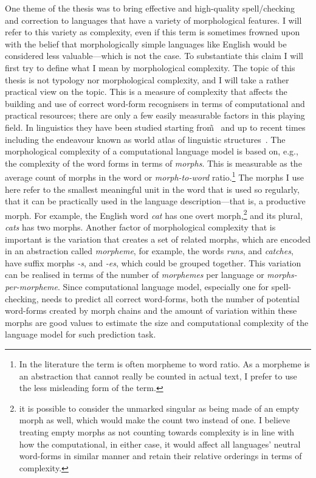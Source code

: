 \documentclass[officiallayout]{unihelcompling}
\begin{document}
One theme of the thesis was to bring effective and high-quality
spell\-/checking and correction to languages that have a variety of
morphological features. I will refer to this variety as complexity, even if
this term is sometimes frowned upon with the belief that morphologically simple
languages like English would be considered less valuable---which is not the
case.  To substantiate this claim I will first try to define what I mean by
morphological complexity.  The topic of this thesis is not typology nor
morphological complexity, and I will take a rather practical view on the topic.
This is a measure of complexity that affects the building and use of correct
word-form recognisers in terms of computational and practical resources; there
are only a few easily measurable factors in this playing field. In linguistics
they have been studied starting from̃~\citep{greenberg1960qualitative} and up
to recent times including the endeavour known as world atlas of linguistic
structures~\citep{wals}.
The
morphological complexity of a computational language model is based on, e.g.,
the complexity of the word forms in terms of \emph{morphs}.  This is measurable
as the average count of morphs in the word or \emph{morph-to-word}
ratio.\footnote{In the literature the term is often morpheme to word ratio. As
a morpheme is an abstraction that cannot really be counted in actual text, I
prefer to use the less misleading form of the term.} The morphs I use here
refer to the smallest meaningful unit in the word that is used so regularly,
that it can be practically used in the language description---that is, a
productive morph. For example, the English word \emph{cat} has one overt
morph,\footnote{it is possible to consider the unmarked singular as being made
    of an empty morph as well, which would make the count two instead of one. I
    believe treating empty morphs as not counting towards complexity is in line
    with how the computational, in either case, it would affect all languages'
    neutral word-forms in similar manner and retain their relative orderings in
terms of complexity.} and its plural, \emph{cats} has two morphs.  Another
factor of morphological complexity that is important is the variation that
creates a set of related morphs, which are encoded in an abstraction called
\emph{morpheme}, for example, the words \emph{runs}, and \emph{catches}, have
suffix morphs \emph{-s}, and \emph{-es}, which could be grouped together. This
variation can be realised in terms of the number of \emph{morphemes} per
language or \emph{morphs-per-morpheme}. Since computational language model,
especially one for spell-checking, needs to predict all correct word-forms,
both the number of potential word-forms created by morph chains and the amount
of variation within these morphs are good values to estimate the size and
computational complexity of the language model for such prediction task.
\end{document}
